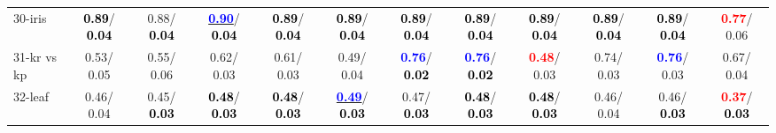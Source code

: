 \begin{table}[h]
\begin{center}
{\begin{tabular}{lc|c|c|c|c|c|c|c|c|c|c}
30-iris & \textcolor{black}{\textbf{  0.89}}/\textcolor{black}{\textbf{  0.04}} &   0.88/\textcolor{black}{\textbf{  0.04}} & \underline{\textcolor{blue}{\textbf{  0.90}}}/\textcolor{black}{\textbf{  0.04}} & \textcolor{black}{\textbf{  0.89}}/\textcolor{black}{\textbf{  0.04}} & \textcolor{black}{\textbf{  0.89}}/\textcolor{black}{\textbf{  0.04}} & \textcolor{black}{\textbf{  0.89}}/\textcolor{black}{\textbf{  0.04}} & \textcolor{black}{\textbf{  0.89}}/\textcolor{black}{\textbf{  0.04}} & \textcolor{black}{\textbf{  0.89}}/\textcolor{black}{\textbf{  0.04}} & \textcolor{black}{\textbf{  0.89}}/\textcolor{black}{\textbf{  0.04}} & \textcolor{black}{\textbf{  0.89}}/\textcolor{black}{\textbf{  0.04}} & \textcolor{red}{\textbf{  0.77}}/  0.06 \\
31-kr vs kp &   0.53/  0.05 &   0.55/  0.06 &   0.62/  0.03 &   0.61/  0.03 &   0.49/  0.04 & \textcolor{blue}{\textbf{  0.76}}/\textcolor{black}{\textbf{  0.02}} & \textcolor{blue}{\textbf{  0.76}}/\textcolor{black}{\textbf{  0.02}} & \textcolor{red}{\textbf{  0.48}}/  0.03 &   0.74/  0.03 & \textcolor{blue}{\textbf{  0.76}}/  0.03 &   0.67/  0.04 \\
32-leaf &   0.46/  0.04 &   0.45/\textcolor{black}{\textbf{  0.03}} & \textcolor{black}{\textbf{  0.48}}/\textcolor{black}{\textbf{  0.03}} & \textcolor{black}{\textbf{  0.48}}/\textcolor{black}{\textbf{  0.03}} & \underline{\textcolor{blue}{\textbf{  0.49}}}/\textcolor{black}{\textbf{  0.03}} &   0.47/\textcolor{black}{\textbf{  0.03}} & \textcolor{black}{\textbf{  0.48}}/\textcolor{black}{\textbf{  0.03}} & \textcolor{black}{\textbf{  0.48}}/\textcolor{black}{\textbf{  0.03}} &   0.46/  0.04 &   0.46/\textcolor{black}{\textbf{  0.03}} & \textcolor{red}{\textbf{  0.37}}/\textcolor{black}{\textbf{  0.03}} \\\end{tabular}}\label{stratsALCKappa0aNBRedux}
\end{center}
\end{table}
